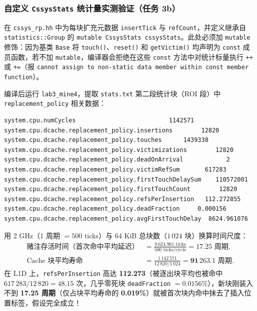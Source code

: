 \documentclass[12pt,a4paper,fontset=mac]{ctexart}
\begin{document}
\subsubsection{自定义 \texttt{CssysStats} 统计量实测验证（任务 3b）}
在 \texttt{cssys\_rp.hh} 中为每块扩充元数据 \texttt{insertTick} 与 \texttt{refCount}，并定义继承自 \texttt{statistics::Group} 的 \texttt{mutable CssysStats cssysStats}。此处必须加 \texttt{mutable} 修饰：因为基类 \texttt{Base} 将 \texttt{touch()}、\texttt{reset()} 和 \texttt{getVictim()} 均声明为 \texttt{const} 成员函数，若不加 \texttt{mutable}，编译器会拒绝在这些 \texttt{const} 方法中对统计标量执行 \texttt{++} 或 \texttt{+=}（报 \texttt{cannot assign to non-static data member within const member function}）。

编译后运行 \texttt{lab3\_mine4}，提取 \texttt{stats.txt} 第二段统计块（ROI 段）中 \texttt{replacement\_policy} 相关数据：

\begin{lstlisting}[language={},caption={任务 3b：L1D（64 KiB / 4 路）ROI 段 CssysStats 实测输出}]
system.cpu.numCycles                          1142571
system.cpu.dcache.replacement_policy.insertions        12820
system.cpu.dcache.replacement_policy.touches      1439338
system.cpu.dcache.replacement_policy.victimizations        12820
system.cpu.dcache.replacement_policy.deadOnArrival            2
system.cpu.dcache.replacement_policy.victimRefSum       617283
system.cpu.dcache.replacement_policy.firstTouchDelaySum    110572001
system.cpu.dcache.replacement_policy.firstTouchCount        12820
system.cpu.dcache.replacement_policy.refsPerInsertion   112.272855
system.cpu.dcache.replacement_policy.deadFraction     0.000156
system.cpu.dcache.replacement_policy.avgFirstTouchDelay  8624.961076
\end{lstlisting}

用 2 GHz（1 周期 $= 500$ ticks）与 64 KiB 总块数（$1\,024$ 块）换算时间尺度：
\begin{align}
\text{赌注存活时间（首次命中平均延迟）} &= \frac{8\,624.961\text{ ticks}}{500\text{ ticks/cycle}} = \mathbf{17.25\text{ 周期}},\\
\text{Cache 块平均寿命} &= \frac{1\,142\,571}{12\,820 / 1\,024} = \mathbf{91\,263.1\text{ 周期}}.
\end{align}
在 L1D 上，\texttt{refsPerInsertion} 高达 \textbf{112.273}（被逐出块平均也被命中 $617\,283/12\,820 = 48.15$ 次，几乎零死块 \texttt{deadFraction} $= 0.0156\%$），新块刚装入不到 \textbf{17.25 周期}（仅占块平均寿命的 \textbf{0.019\%}）就被首次块内命中抹去了插入位置标签，假设完全成立！
\end{document}
